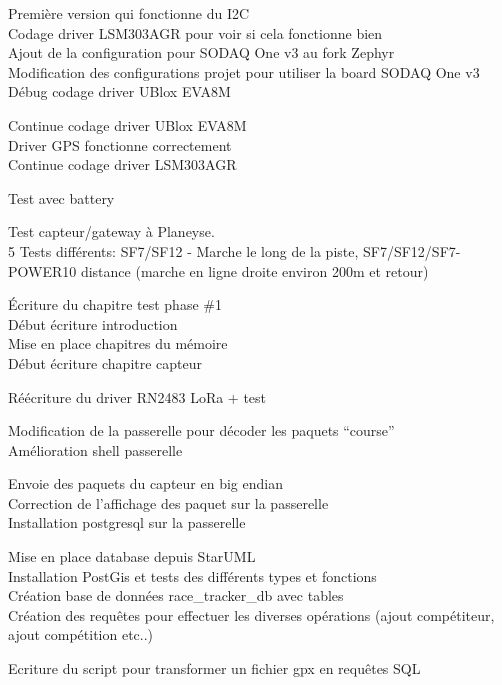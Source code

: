 \begin{multicols}{2}
Première version qui fonctionne du I2C\\
Codage driver LSM303AGR pour voir si cela fonctionne bien\\
Ajout de la configuration pour SODAQ One v3 au fork Zephyr\\
Modification des configurations projet pour utiliser la board SODAQ One v3\\
Débug codage driver UBlox EVA8M

Continue codage driver UBlox EVA8M\\
Driver GPS fonctionne correctement\\
Continue codage driver LSM303AGR

Test avec battery

Test capteur/gateway à Planeyse. \\
5 Tests différents: SF7/SF12 - Marche le long de la piste, SF7/SF12/SF7-POWER10 distance (marche en ligne droite environ 200m et retour)

Écriture du chapitre test phase \#1\\
Début écriture introduction\\
Mise en place chapitres du mémoire\\
Début écriture chapitre capteur

Réécriture du driver RN2483 LoRa + test

Modification de la passerelle pour décoder les paquets “course”\\
Amélioration shell passerelle

Envoie des paquets du capteur en big endian\\
Correction de l’affichage des paquet sur la passerelle\\
Installation postgresql sur la passerelle

Mise en place database depuis StarUML\\
Installation PostGis et tests des différents types et fonctions\\
Création base de données race\_tracker\_db avec tables\\
Création des requêtes pour effectuer les diverses opérations (ajout compétiteur, ajout compétition etc..)

Ecriture du script pour transformer un fichier gpx en requêtes SQL


\end{multicols}
